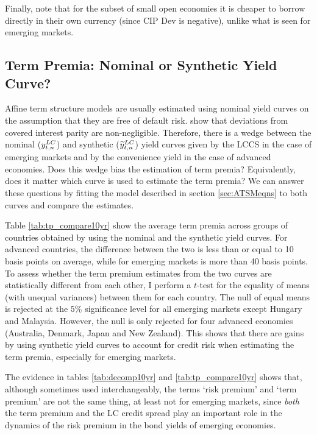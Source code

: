 {Finally, note that for the subset of small open economies it is cheaper to borrow directly in their own currency (since CIP Dev is negative), unlike what is seen for emerging markets.

\subsection{Term Premia: Nominal or Synthetic Yield Curve?}
Affine term structure models are usually estimated using nominal yield curves on the assumption that they are free of default risk. \cite{DuTepperVerdelhan:2018} show that deviations from covered interest parity are non-negligible. Therefore, there is a wedge between the nominal ($y_{t,n} ^{LC}$) and synthetic ($\widetilde{y}_{t,n} ^{LC}$) yield curves given by the LCCS in the case of emerging markets and by the convenience yield in the case of advanced economies. Does this wedge bias the estimation of term premia? Equivalently, does it matter which curve is used to estimate the term premia? We can answer these questions by fitting the model described in section \ref{sec:ATSMeqns} to both curves and compare the estimates.

Table \ref{tab:tp_compare10yr} show the average term premia across groups of countries obtained by using the nominal and the synthetic yield curves. For advanced countries, the difference between the two is less than or equal to 10 basis points on average, while for emerging markets is more than 40 basis points. To assess whether the term premium estimates from the two curves are statistically different from each other, I perform a $t$-test for the equality of means (with unequal variances) between them for each country. The null of equal means is rejected at the $5$\% significance level for all emerging markets except Hungary and Malaysia. However, the null is only rejected for four advanced economies (Australia, Denmark, Japan and New Zealand). This shows that there are gains by using synthetic yield curves to account for credit risk when estimating the term premia, especially for emerging markets.
	

The evidence in tables \ref{tab:decomp10yr} and \ref{tab:tp_compare10yr} shows that, although sometimes used interchangeably, the terms `risk premium' and `term premium' are not the same thing, at least not for emerging markets, since \textit{both} the term premium and the LC credit spread play an important role in the dynamics of the risk premium in the bond yields of emerging economies.

}
